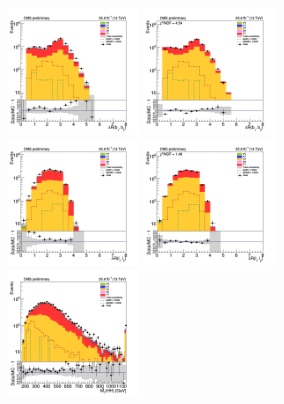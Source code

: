 


\begin{figure}[tbp]
  \begin{center}
    \includegraphics[width=0.31\textwidth]{figures/mm_300_april18/dR_bjets_mm_CRDY_prefit_plot_apr18.png}
    \includegraphics[width=0.31\textwidth]{figures/mm_300_april18/dR_bjets_mm_CRDY_FullPostfit_plot_apr18.png}\\
    \includegraphics[width=0.31\textwidth]{figures/mm_300_april18/dR_leps_mm_CRDY_prefit_plot_apr18.png}
    \includegraphics[width=0.31\textwidth]{figures/mm_300_april18/dR_leps_mm_CRDY_FullPostfit_plot_apr18.png}\\
    \includegraphics[width=0.31\textwidth]{figures/mm_300_april18/hhMt_mm_CRDY_prefit_plot_apr18.png}

\end{center}
\end{figure}

